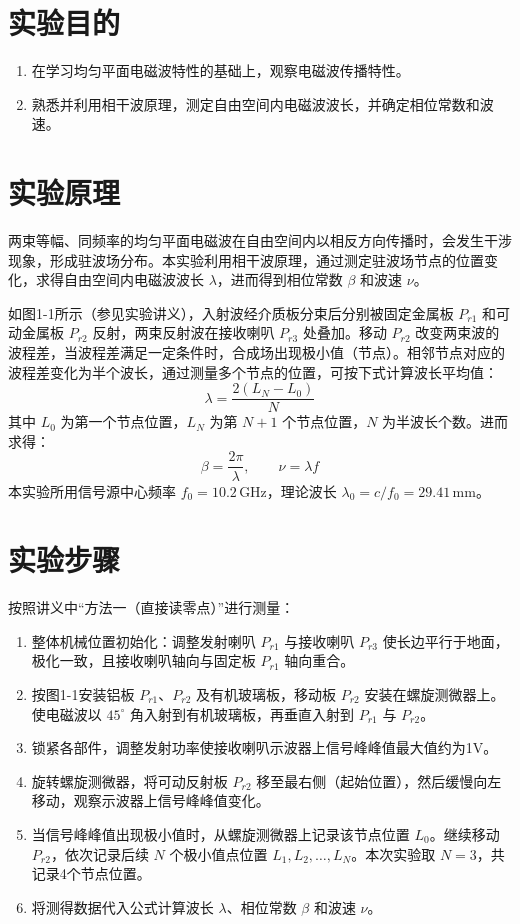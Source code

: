 \documentclass{../ElectromagneticFieldTemplate}
\begin{document}
\maketitle

\section{实验目的}
\begin{enumerate}
    \item 在学习均匀平面电磁波特性的基础上，观察电磁波传播特性。
    \item 熟悉并利用相干波原理，测定自由空间内电磁波波长，并确定相位常数和波速。
\end{enumerate}

\section{实验原理}
两束等幅、同频率的均匀平面电磁波在自由空间内以相反方向传播时，会发生干涉现象，形成驻波场分布。本实验利用相干波原理，通过测定驻波场节点的位置变化，求得自由空间内电磁波波长 \(\lambda\)，进而得到相位常数 \(\beta\) 和波速 \(\nu\)。

如图1-1所示（参见实验讲义），入射波经介质板分束后分别被固定金属板 \(P_{r1}\) 和可动金属板 \(P_{r2}\) 反射，两束反射波在接收喇叭 \(P_{r3}\) 处叠加。移动 \(P_{r2}\) 改变两束波的波程差，当波程差满足一定条件时，合成场出现极小值（节点）。相邻节点对应的波程差变化为半个波长，通过测量多个节点的位置，可按下式计算波长平均值：
\[
\lambda = \frac{2(L_N - L_0)}{N}
\]
其中 \(L_0\) 为第一个节点位置，\(L_N\) 为第 \(N+1\) 个节点位置，\(N\) 为半波长个数。进而求得：
\[
\beta = \frac{2\pi}{\lambda}, \qquad \nu = \lambda f
\]
本实验所用信号源中心频率 \(f_0 = 10.2\,\text{GHz}\)，理论波长 \(\lambda_0 = c/f_0 = 29.41\,\text{mm}\)。

\section{实验步骤}
按照讲义中“方法一（直接读零点）”进行测量：
\begin{enumerate}
    \item 整体机械位置初始化：调整发射喇叭 \(P_{r1}\) 与接收喇叭 \(P_{r3}\) 使长边平行于地面，极化一致，且接收喇叭轴向与固定板 \(P_{r1}\) 轴向重合。
    \item 按图1-1安装铝板 \(P_{r1}\)、\(P_{r2}\) 及有机玻璃板，移动板 \(P_{r2}\) 安装在螺旋测微器上。使电磁波以 \(45^\circ\) 角入射到有机玻璃板，再垂直入射到 \(P_{r1}\) 与 \(P_{r2}\)。
    \item 锁紧各部件，调整发射功率使接收喇叭示波器上信号峰峰值最大值约为1V。
    \item 旋转螺旋测微器，将可动反射板 \(P_{r2}\) 移至最右侧（起始位置），然后缓慢向左移动，观察示波器上信号峰峰值变化。
    \item 当信号峰峰值出现极小值时，从螺旋测微器上记录该节点位置 \(L_0\)。继续移动 \(P_{r2}\)，依次记录后续 \(N\) 个极小值点位置 \(L_1, L_2, \ldots, L_N\)。本次实验取 \(N=3\)，共记录4个节点位置。
    \item 将测得数据代入公式计算波长 \(\lambda\)、相位常数 \(\beta\) 和波速 \(\nu\)。
\end{enumerate}
\end{document}
